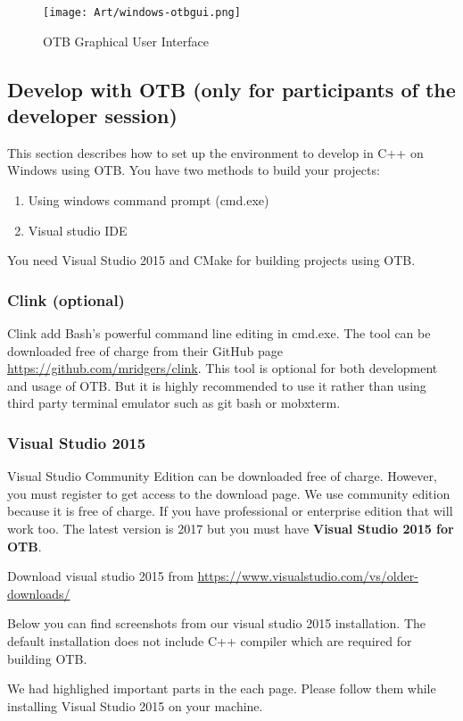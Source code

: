 \documentclass[10pt,a4paper]{article}
\begin{document}
\begin{figure}[!htbp]
  \center
  \texttt{[image: Art/windows-otbgui.png]}
  \caption[]{OTB Graphical User Interface}
  \label{fig:windows-otbgui}
\end{figure}


\subsection{Develop with OTB (only for participants of the developer session)}

This section describes how to set up the environment to develop in C++ on
Windows using OTB.
You have two methods to build your projects:
\begin{enumerate}
\item Using windows command prompt (cmd.exe)
\item Visual studio IDE
\end{enumerate}

You need Visual Studio 2015 and CMake for building projects using OTB.

\subsubsection{Clink (optional)}
Clink add Bash's powerful command line editing in
cmd.exe. The tool can be downloaded free of charge from their GitHub
page \url{https://github.com/mridgers/clink}. This tool is optional for both development and usage of OTB.
But it is highly recommended to use it rather than using third party terminal emulator such as git bash or
mobxterm.

\subsubsection{Visual Studio 2015}
Visual Studio Community Edition can be downloaded free of charge. However, you must register
to get access to the download page. We use community edition because it is free
of charge. If you have professional or enterprise edition that will work
too. The latest version is 2017 but you must have \textbf{Visual Studio 2015 for OTB}. 

Download visual studio 2015 from \url{https://www.visualstudio.com/vs/older-downloads/}

Below you can find screenshots from our visual studio 2015 installation.
The default installation does not include C++ compiler which are required for building OTB.

We had highlighed important parts in the each page. Please follow them while installing Visual Studio 2015
on your machine.
\end{document}

